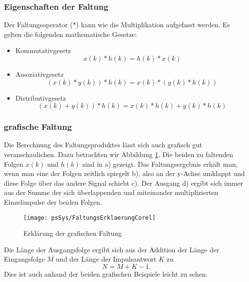 \subsubsection{Eigenschaften der Faltung}
Der Faltungsoperator ($\ast$) kann wie die Multiplikation aufgefasst werden.
Es gelten die folgenden mathematische Gesetze:
\begin{itemize}
\item Kommutativgesetz
\begin{equation}\label{eq:FaltungKommu}
    x(k) \ast h(k) = h(k) \ast x(k)
\end{equation}
\item Assoziativgesetz
\begin{equation}\label{eq:FaltungAssoz}
   ( x(k) \ast y(k)) \ast h(k) =  x(k) \ast (y(k) \ast h(k))
\end{equation}
\item Distributivgesetz
\begin{equation}\label{eq:FaltungDistrib}
   ( x(k) + y(k)) \ast h(k) =  x(k)\ast h(k) +  y(k) \ast h(k)
\end{equation}


\end{itemize}

\subsubsection{grafische Faltung}
Die Berechnung des Faltungsproduktes lässt sich auch grafisch gut
veranschaulichen. Dazu betrachten wir Abbildung
\ref{pic:GraphischeFaltungErk}. Die beiden zu faltenden Folgen $x(k)$
und $h(k)$ sind in a) gezeigt. Das Faltungsergebnis erhält man,
wenn man eine der Folgen zeitlich spiegelt b), also an der y-Achse
umklappt und diese Folge über das andere Signal schiebt c). Der
Ausgang d) ergibt sich immer aus der Summe der sich überlappenden
und miteinander multiplizierten Einzelimpulse der beiden Folgen.

\begin{figure}[H]
\begin{center}
\texttt{[image: psSys/FaltungsErklaerungCorel]}
\caption{\label{pic:GraphischeFaltungErk} Erklärung der grafischen
Faltung}
\end{center}
\end{figure}

Die Länge der Ausgangsfolge ergibt sich aus der Addition der
Länge der Eingangsfolge $M$ und der Länge der Impulsantwort $K$ zu
\begin{equation}
    N = M + K - 1.
\end{equation}
Dies ist auch anhand der beiden grafischen Beispiele
leicht zu sehen.

